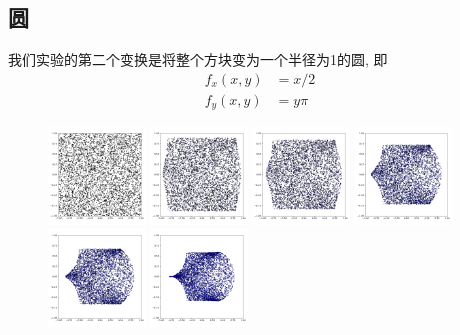 \documentclass[lang=cn,11pt]{elegantpaper}
\begin{document}
\subsection{圆}

我们实验的第二个变换是将整个方块变为一个半径为1的圆, 即
\begin{align}
	f_x(x,y)&=x/2 \\
	f_y(x,y)&=y\pi
\end{align}

\begin{figure}[hbt]
\centering
  \includegraphics[width=0.23\textwidth]{circle_1_1}
  \includegraphics[width=0.23\textwidth]{circle_1_2}
  \includegraphics[width=0.23\textwidth]{circle_1_3}
  \includegraphics[width=0.23\textwidth]{circle_1_4}\\
  \includegraphics[width=0.23\textwidth]{circle_1_5}
  \includegraphics[width=0.23\textwidth]{circle_1_6}

\end{figure}
\end{document}
